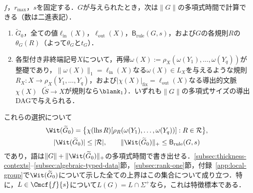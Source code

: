 \begin{proposition}[短い特徴データの計算と規則のみのデータ予算]
\label{prop:effective-char-data}
\label{prop:computed-witness-budget}
\label{prop:rule-only-witnesses}
$f$，$r_{\max}$，$s$を固定する．$G$が与えられたとき，次は$\|G\|$の多項式時間で計算できる（数は二進表記）．
\begin{enumerate}[label=\textup{(\roman*)},leftmargin=*]
\item $\widetilde G_0$，全ての値$\ell_{\mathrm{in}}(X)$，$\ell_{\mathrm{out}}(X)$，$\mathsf B_{\mathrm{rule}}(G,s)$，および$G$の各規則$R$の$\theta_G(R)$（よって$\theta_G$と$t_G$）．
\item 各型付き非終端記号$X$について，再帰$\omega(X):=\rho_X(\omega(Y_1),\ldots,\omega(Y_q))$が整礎であり，$\|\omega(X)\|_1=\ell_{\mathrm{in}}(X)$なる$\omega(X)\in L_X$を与えるような規則$R_X:X\to\rho_X(Y_1,\ldots,Y_q)$，および$|\chi(X)|_{\mathrm{fix}}=\ell_{\mathrm{out}}(X)$なる導出的文脈$\chi(X)$（$\widetilde S\to X$が規則なら$\blank_1$）．いずれも$\|G\|$の多項式サイズの導出DAGで与えられる．
\end{enumerate}
これらの選択について
\[
 \begin{gathered}
 \Wit(\widetilde G_0)=\bigl\{\chi(\operatorname{lhs}R)[\rho_R(\omega(Y_1),\ldots,\omega(Y_q))]:
 R\in\mathcal R\bigr\},\\
 |\Wit(\widetilde G_0)|\le|\mathcal R|,\qquad
 \|\Wit(\widetilde G_0)\|_+\le\mathsf B_{\mathrm{rule}}(G,s)
 \end{gathered}
\]
であり，語は$\|G\|+\|\Wit(\widetilde G_0)\|_+$の多項式時間で書き出せる．\ref{subsec:thickness-contexts}--\ref{subsec:algebraic-typed-data}節，\ref{subsec:rank-one}節，付録~\ref{app:local-group}で$\Wit(\widetilde G_0)$について示した全ての上界はこの集合について成り立つ．特に，$L\in\Cmcf{f}{s}$について$L(G)=L\cap\Sigma^+$なら，これは特徴標本である．
\end{proposition}

